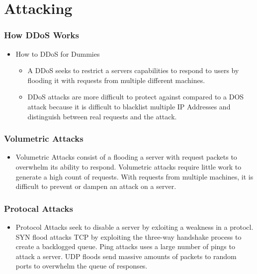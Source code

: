 \documentclass{beamer}
\begin{document}
\section{Attacking}

\begin{frame}
    \frametitle{How DDoS Works}
    \begin{itemize}
        \item How to DDoS for Dummies
            \begin{itemize}
                \item<+-> A DDoS seeks to restrict a servers capabilities to respond to users by flooding it with requests from multiple different machines.
                \item<+-> DDoS attacks are more difficult to protect against compared to a DOS attack because it is difficult to blacklist multiple IP Addresses and distinguish between real requests and the attack.
            \end{itemize}
    \end{itemize}
\end{frame}

\begin{frame}
    \frametitle{Volumetric Attacks}
        \begin{itemize}
            \item Volumetric Attacks consist of a flooding a server with request packets to overwhelm its ability to respond. Volumetric attacks require little work to generate a high count of requests. With requests from multiple machines, it is difficult to prevent or dampen an attack on a server.
    \end{itemize}
\end{frame}
\begin{frame}
    \frametitle{Protocal Attacks}
     \begin{itemize}
            \item <+->Protocol Attacks seek to disable a server by exloiting a weakness in a protocl. SYN flood attacks TCP by exploiting the three-way handshake process to create a backlogged queue. Ping attacks uses a large number of pings to attack a server. UDP floods send massive amounts of packets to random ports to overwhelm the queue of responses.
        \end{itemize}
\end{frame}
\end{document}
